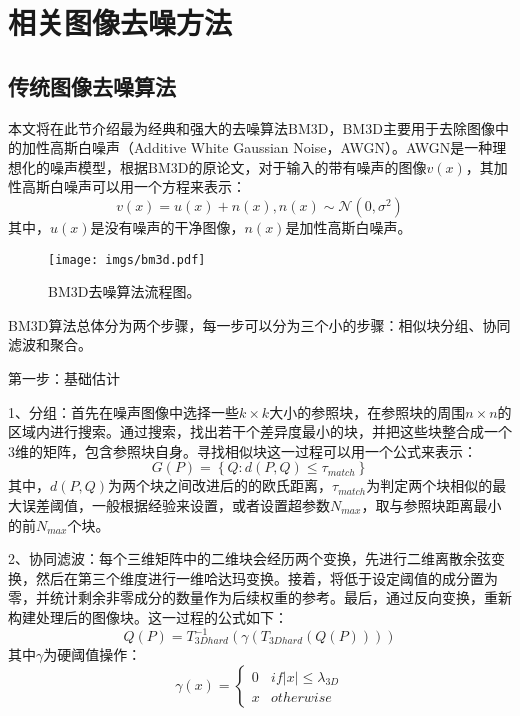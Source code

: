 \section{相关图像去噪方法}
\subsection{传统图像去噪算法}

本文将在此节介绍最为经典和强大的去噪算法BM3D\cite{bm3d}，BM3D主要用于去除图像中的加性高斯白噪声（Additive White Gaussian Noise，AWGN）。AWGN是一种理想化的噪声模型，根据BM3D的原论文\cite{bm3d}，对于输入的带有噪声的图像$v(x)$，其加性高斯白噪声可以用一个方程来表示：
\begin{equation}
	v(x)=u(x)+n(x), n(x) \sim \mathcal{N}\left(0, \sigma^2\right) 
\end{equation}
其中，$u(x)$是没有噪声的干净图像，$n(x)$是加性高斯白噪声。

\begin{figure}[h]
	\centering
	\texttt{[image: imgs/bm3d.pdf]}
	\caption{BM3D去噪算法流程图。\cite{bm3d}}
	\label{fig:bm3d}
\end{figure}

BM3D算法总体分为两个步骤，每一步可以分为三个小的步骤：相似块分组、协同滤波和聚合。

第一步：基础估计

1、分组：首先在噪声图像中选择一些$k\times k$大小的参照块，在参照块的周围$n \times n$的区域内进行搜索。通过搜索，找出若干个差异度最小的块，并把这些块整合成一个$3$维的矩阵，包含参照块自身。寻找相似块这一过程可以用一个公式来表示：
\begin{equation}
	G(P)=\left\{Q: d(P, Q) \leq \tau_{match}\right\}
\end{equation}
其中，$d(P, Q)$为两个块之间改进后的的欧氏距离，$\tau_{match}$为判定两个块相似的最大误差阈值，一般根据经验来设置，或者设置超参数$N_{max}$，取与参照块距离最小的前$N_{max}$个块。

2、协同滤波：每个三维矩阵中的二维块会经历两个变换，先进行二维离散余弦变换，然后在第三个维度进行一维哈达玛变换。接着，将低于设定阈值的成分置为零，并统计剩余非零成分的数量作为后续权重的参考。最后，通过反向变换，重新构建处理后的图像块。这一过程的公式如下：
\begin{equation}
	Q(P)=T_{3Dhard }^{-1}\left(\gamma\left(T_{3Dhard}(Q(P))\right)\right)
\end{equation}
其中$\gamma$为硬阈值操作：
\begin{equation}
	\gamma(x)=\left\{\begin{array}{ll}
		0 &  if |x| \leq \lambda_{3D} \\
		x & otherwise
	\end{array} \right.
\end{equation}

